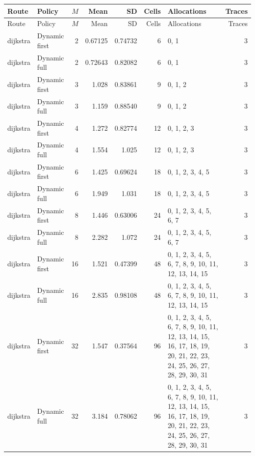 \documentclass[10pt,a4paper]{article}
\begin{document}
\tiny\setlength{\tabcolsep}{2pt}\begin{longtable}{@{}p{23mm}p{29mm}rrrrp{36mm}r@{}}
\toprule Route & Policy & $M$ & Mean & SD & Cells & Allocations & Traces \\ \midrule\endfirsthead
\toprule Route & Policy & $M$ & Mean & SD & Cells & Allocations & Traces \\ \midrule\endhead
\bottomrule\endfoot
dijkstra & Dynamic first & 2 & 0.67125 & 0.74732 & 6 & 0, 1 & 3 \\
dijkstra & Dynamic full & 2 & 0.72643 & 0.82082 & 6 & 0, 1 & 3 \\
dijkstra & Dynamic first & 3 & 1.028 & 0.83861 & 9 & 0, 1, 2 & 3 \\
dijkstra & Dynamic full & 3 & 1.159 & 0.88540 & 9 & 0, 1, 2 & 3 \\
dijkstra & Dynamic first & 4 & 1.272 & 0.82774 & 12 & 0, 1, 2, 3 & 3 \\
dijkstra & Dynamic full & 4 & 1.554 & 1.025 & 12 & 0, 1, 2, 3 & 3 \\
dijkstra & Dynamic first & 6 & 1.425 & 0.69624 & 18 & 0, 1, 2, 3, 4, 5 & 3 \\
dijkstra & Dynamic full & 6 & 1.949 & 1.031 & 18 & 0, 1, 2, 3, 4, 5 & 3 \\
dijkstra & Dynamic first & 8 & 1.446 & 0.63006 & 24 & 0, 1, 2, 3, 4, 5, 6, 7 & 3 \\
dijkstra & Dynamic full & 8 & 2.282 & 1.072 & 24 & 0, 1, 2, 3, 4, 5, 6, 7 & 3 \\
dijkstra & Dynamic first & 16 & 1.521 & 0.47399 & 48 & 0, 1, 2, 3, 4, 5, 6, 7, 8, 9, 10, 11, 12, 13, 14, 15 & 3 \\
dijkstra & Dynamic full & 16 & 2.835 & 0.98108 & 48 & 0, 1, 2, 3, 4, 5, 6, 7, 8, 9, 10, 11, 12, 13, 14, 15 & 3 \\
dijkstra & Dynamic first & 32 & 1.547 & 0.37564 & 96 & 0, 1, 2, 3, 4, 5, 6, 7, 8, 9, 10, 11, 12, 13, 14, 15, 16, 17, 18, 19, 20, 21, 22, 23, 24, 25, 26, 27, 28, 29, 30, 31 & 3 \\
dijkstra & Dynamic full & 32 & 3.184 & 0.78062 & 96 & 0, 1, 2, 3, 4, 5, 6, 7, 8, 9, 10, 11, 12, 13, 14, 15, 16, 17, 18, 19, 20, 21, 22, 23, 24, 25, 26, 27, 28, 29, 30, 31 & 3 \\
\end{longtable}\normalsize\setlength{\tabcolsep}{6pt}
\clearpage
\end{document}
